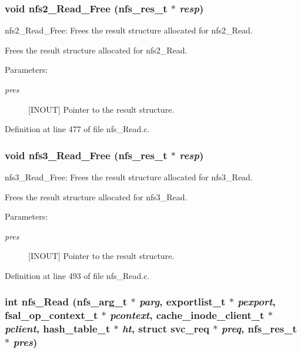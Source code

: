 \subsubsection{\setlength{\rightskip}{0pt plus 5cm}void nfs2\_\-Read\_\-Free (nfs\_\-res\_\-t $\ast$ {\em resp})}\label{nfs__Read_8c_a1}


nfs2\_\-Read\_\-Free: Frees the result structure allocated for nfs2\_\-Read.

Frees the result structure allocated for nfs2\_\-Read.

\begin{Desc}
\item[Parameters:]
\begin{description}
\item[{\em pres}][INOUT] Pointer to the result structure. \end{description}
\end{Desc}


Definition at line 477 of file nfs\_\-Read.c.
\subsubsection{\setlength{\rightskip}{0pt plus 5cm}void nfs3\_\-Read\_\-Free (nfs\_\-res\_\-t $\ast$ {\em resp})}\label{nfs__Read_8c_a2}


nfs3\_\-Read\_\-Free: Frees the result structure allocated for nfs3\_\-Read.

Frees the result structure allocated for nfs3\_\-Read.

\begin{Desc}
\item[Parameters:]
\begin{description}
\item[{\em pres}][INOUT] Pointer to the result structure. \end{description}
\end{Desc}


Definition at line 493 of file nfs\_\-Read.c.
\subsubsection{\setlength{\rightskip}{0pt plus 5cm}int nfs\_\-Read (nfs\_\-arg\_\-t $\ast$ {\em parg}, exportlist\_\-t $\ast$ {\em pexport}, fsal\_\-op\_\-context\_\-t $\ast$ {\em pcontext}, cache\_\-inode\_\-client\_\-t $\ast$ {\em pclient}, hash\_\-table\_\-t $\ast$ {\em ht}, struct svc\_\-req $\ast$ {\em preq}, nfs\_\-res\_\-t $\ast$ {\em pres})}\label{nfs__Read_8c_a0}


